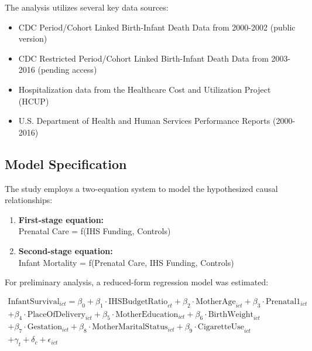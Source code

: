 \documentclass[12pt]{article}
\begin{document}
The analysis utilizes several key data sources:
\begin{itemize}
    \item CDC Period/Cohort Linked Birth-Infant Death Data from 2000-2002 (public version)
    \item CDC Restricted Period/Cohort Linked Birth-Infant Death Data from 2003-2016 (pending access)
    \item Hospitalization data from the Healthcare Cost and Utilization Project (HCUP)
    \item U.S. Department of Health and Human Services Performance Reports (2000-2016)
\end{itemize}

\subsection{Model Specification}

The study employs a two-equation system to model the hypothesized causal relationships:

\begin{enumerate}
    \item \textbf{First-stage equation:}\\
    Prenatal Care = f(IHS Funding, Controls)
    
    \item \textbf{Second-stage equation:}\\
    Infant Mortality = f(Prenatal Care, IHS Funding, Controls)
\end{enumerate}

For preliminary analysis, a reduced-form regression model was estimated:

\begin{equation}
\begin{split}
\text{InfantSurvival}_{ict} = \beta_0 + \beta_1 \cdot \text{IHSBudgetRatio}_{ct} + \beta_2 \cdot \text{MotherAge}_{ict} + \beta_3 \cdot \text{Prenatal1}_{ict} \\
+ \beta_4 \cdot \text{PlaceOfDelivery}_{ict} + \beta_5 \cdot \text{MotherEducation}_{ict} + \beta_6 \cdot \text{BirthWeight}_{ict} \\
+ \beta_7 \cdot \text{Gestation}_{ict} + \beta_8 \cdot \text{MotherMaritalStatus}_{ict} + \beta_9 \cdot \text{CigaretteUse}_{ict} \\
+ \gamma_t + \delta_c + \epsilon_{ict}
\end{split}
\end{equation}
\end{document}
